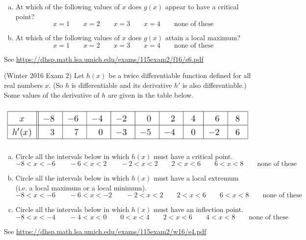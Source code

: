 \documentclass[11pt]{exam}
\begin{document}
\begin{questions}
\begin{center}
        \end{center}
\begin{enumerate}[(a)]
	\item At which of the following values of $x$ does $g(x)$ appear to have a critical point?		
	$$x=1 \qquad x=2 \qquad x=3 \qquad x=4 \qquad \textrm{none of these}$$
	\item At which of the following values of $x$ does $g(x)$ attain a local maximum?
	$$x=1 \qquad x=2 \qquad x=3 \qquad x=4 \qquad \textrm{none of these}$$
	\end{enumerate}
        \begin{solution}
          See \href{https://dhsp.math.lsa.umich.edu/exams/115exam2/f16/s6.pdf}{https://dhsp.math.lsa.umich.edu/exams/115exam2/f16/s6.pdf}
        \end{solution}
\question (Winter 2016 Exam 2) %
	Let $h(x)$ be a twice differentiable function defined for all real numbers $x$. (So $h$ is differentiable and its derivative $h'$ is also differentiable.)
Some values of the derivative of $h$ are given in the table below.
\begin{center}
  \includegraphics[scale=0.5]{Winter2016Exam2Problem4}
\end{center}
\begin{enumerate}[(a)]
\item Circle all the intervals below in which $h(x)$ must have a critical point.
$$-8 < x < -6  \qquad -6 < x < 2 \qquad -2 < x < 2 \qquad 2 < x < 6 \qquad 6 < x < 8 \qquad \textrm{none of these}$$
\item Circle all the intervals below in which $h(x)$ must have a local extremum (i.e. a local maximum or a local minimum).
$$-8 < x < -6  \qquad -6 < x < -2 \qquad -2< x < 2 \qquad 2 < x < 6 \qquad 6< x < 8 \qquad \textrm{none of these}$$
\item Circle all the intervals below in which $h(x)$ must have an inflection point.
$$-8 < x < -4  \qquad -4 < x < 0 \qquad 0 < x < 4 \qquad 2 < x < 6 \qquad 4 < x < 8 \qquad \textrm{none of these}$$
\end{enumerate}
\begin{solution}
  See \href{https://dhsp.math.lsa.umich.edu/exams/115exam2/w16/s4.pdf}{https://dhsp.math.lsa.umich.edu/exams/115exam2/w16/s4.pdf}
\end{solution}
\end{questions}
\end{document}
